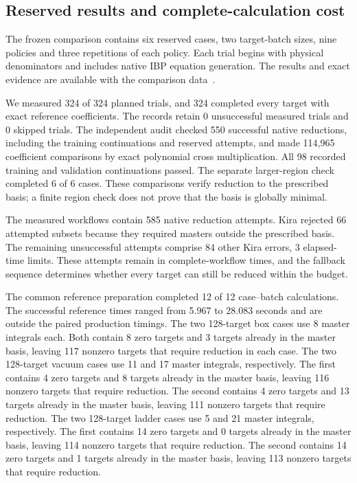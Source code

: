 \subsection{Reserved results and complete-calculation cost}
The frozen comparison contains six reserved cases, two target-batch
sizes, nine policies and three repetitions of each policy. Each trial
begins with physical denominators and includes native IBP equation
generation. The results and exact evidence are available with the
comparison data~\cite{KiraCompleteMultiloopData}.

We measured 324 of 324 planned trials, and 324 completed every target with exact reference coefficients. The records retain 0 unsuccessful measured trials and 0 skipped trials. The independent audit checked 550 successful native reductions, including the training continuations and reserved attempts, and made 114,965 coefficient comparisons by exact polynomial cross multiplication. All 98 recorded training and validation continuations passed. The separate larger-region check completed 6 of 6 cases. These comparisons verify reduction to the prescribed basis; a finite region check does not prove that the basis is globally minimal.

The measured workflows contain 585 native reduction attempts. Kira rejected 66 attempted subsets because they required masters outside the prescribed basis. The remaining unsuccessful attempts comprise 84 other Kira errors, 3 elapsed-time limits. These attempts remain in complete-workflow times, and the fallback sequence determines whether every target can still be reduced within the budget.

The common reference preparation completed 12 of 12 case--batch calculations. The successful reference times ranged from 5.967 to 28.083 seconds and are outside the paired production timings. The two 128-target box cases use 8 master integrals each. Both contain 8 zero targets and 3 targets already in the master basis, leaving 117 nonzero targets that require reduction in each case. The two 128-target vacuum cases use 11 and 17 master integrals, respectively. The first contains 4 zero targets and 8 targets already in the master basis, leaving 116 nonzero targets that require reduction. The second contains 4 zero targets and 13 targets already in the master basis, leaving 111 nonzero targets that require reduction. The two 128-target ladder cases use 5 and 21 master integrals, respectively. The first contains 14 zero targets and 0 targets already in the master basis, leaving 114 nonzero targets that require reduction. The second contains 14 zero targets and 1 targets already in the master basis, leaving 113 nonzero targets that require reduction. 

